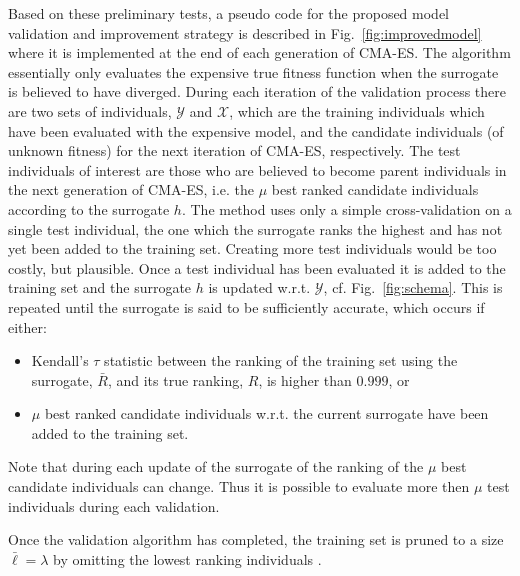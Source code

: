 \documentclass[10pt, conference]{IEEEtran} %
\begin{document}
Based on these preliminary tests, a pseudo code for the proposed model validation and improvement strategy is described in Fig.~\ref{fig:improvedmodel} where it is implemented at the end of each generation of CMA-ES. The algorithm essentially only evaluates the expensive true fitness function when the surrogate is believed to have diverged. During each iteration of the validation process there are two sets of individuals, $\mathcal{Y}$ and $\mathcal{X}$, which are the training individuals  which have been evaluated with the expensive model, and the candidate individuals (of unknown fitness) for the next iteration of CMA-ES, respectively. The test individuals  of interest are those who are believed to become parent individuals  in the next generation of CMA-ES, i.e. the $\mu$ best ranked candidate individuals according to the surrogate $h$. The method uses only a simple cross-validation on a single test individual, the one which the surrogate ranks the highest and has not yet been added to the training set. Creating more test individuals  would be too costly, but plausible. Once a test individual has been evaluated it is added to the training set and the surrogate $h$ is updated w.r.t. $\mathcal{Y}$, cf. Fig.~\ref{fig:schema}. This is repeated until the surrogate is said to be sufficiently accurate, which occurs if either:
\begin{itemize}
  \item Kendall's $\tau$ statistic between the ranking of the training set using the surrogate, $\bar{R}$, and its true ranking, $R$, is higher than $0.999$, or
  \item $\mu$ best ranked candidate individuals w.r.t. the current surrogate have been added to the training set.
\end{itemize}
Note that during each update of the surrogate of the ranking of the $\mu$ best candidate individuals can change. Thus it is possible to evaluate more then $\mu$ test individuals  during each validation. 

Once the validation algorithm has completed, the training set is pruned to a size $\bar{\ell}=\lambda$ by omitting the lowest ranking individuals . 
\end{document}
